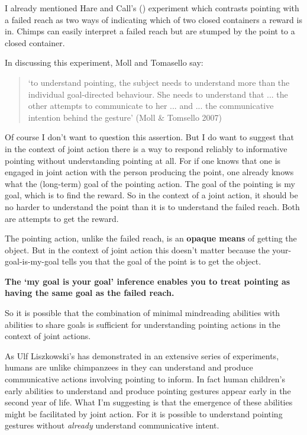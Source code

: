 \documentclass[12pt,a4paper]{extarticle}
\begin{document}
I already mentioned Hare and Call's (\citeyear{hare_chimpanzees_2004}) experiment which contrasts pointing with a failed reach as two ways of indicating which of two closed containers a reward is in.  
Chimps can easily interpret a failed reach but are stumped by the point to a closed container.

In discussing this experiment, Moll and Tomasello say:
%
\begin{quote}
`to understand pointing, the subject needs to understand more than the individual goal-directed behaviour. She needs to understand that ... the other attempts to communicate to her ...  and ... the communicative intention behind the gesture'
(Moll \& Tomsello 2007)
\end{quote}
%
Of course I don't want to question this assertion.
But I do want to suggest that in the context of joint action there is a way to respond reliably to informative pointing without understanding pointing at all.
For if one knows that one is engaged in joint action with the person producing the point, one already knows what the (long-term) goal of the pointing action.  
The goal of the pointing is my goal, which is to find the reward.
So in the context of a joint action, it should be no harder to understand the point than it is to understand the failed reach.
Both are attempts to get the reward.

The pointing action, unlike the failed reach, is an \textbf{opaque means} of getting the object.  But in the context of joint action this doesn't matter because the your-goal-is-my-goal tells you that the goal of the point is to get the object.

\textbf{The `my goal is your goal' inference enables you to treat pointing as having the same goal as the failed reach.}

So it is possible that the combination of minimal mindreading abilities with abilities to share goals is sufficient for understanding pointing actions in the context of joint actions.

As Ulf Liszkowski's has demonstrated in an extensive series of experiments, humans are unlike chimpanzees in they can understand and produce communicative actions involving pointing to inform.
In fact human children's early abilities to understand and produce pointing gestures appear early in the second year of life.
What I'm suggesting is that the emergence of these abilities might be facilitated by joint action.
For it is possible to understand pointing gestures without \emph{already} understand communicative intent.
\end{document}
